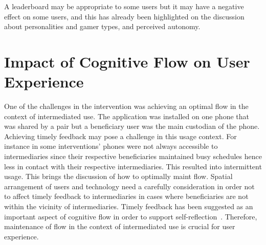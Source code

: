 A leaderboard may be appropriate to some users but it may have a negative effect on some users, and this has already been highlighted on the discussion about personalities and gamer types, and perceived autonomy. 

\section{Impact of Cognitive Flow on User Experience}
One of the challenges in the intervention was achieving an optimal flow in the context of intermediated use. The application was installed on one phone that was shared by a pair but a beneficiary user was the main custodian of the phone. Achieving timely feedback may pose a challenge in this usage context. For instance in some interventions' phones were not always accessible  to intermediaries since their respective beneficiaries maintained busy schedules hence less in contact with their respective intermediaries. This resulted into intermittent usage. This brings the discussion of how to optimally maint flow. Spatial arrangement of users and technology need a carefully consideration in order not to affect timely feedback to intermediaries in cases where beneficiaries are not within the vicinity of intermediaries. Timely feedback  has been suggested as an important aspect of cognitive flow in order to support self-reflection~\cite{csikszentmihalyiflow}. Therefore, maintenance of flow in the context of intermediated use is crucial for user experience. 

